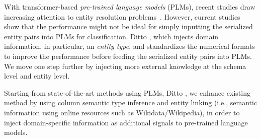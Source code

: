 With transformer-based \emph{pre-trained language models} (PLMs), recent studies draw increasing attention to entity resolution problems~\cite{li_deep_2020, trabelsi_dame_2022}. However, current studies show that the performance might not be ideal for simply inputting the serialized entity pairs into PLMs for classification. Ditto \cite{li_deep_2020}, which injects domain information, in particular, an \emph{entity type}, and standardizes the numerical formats to improve the performance before feeding the serialized entity pairs into PLMs. We move one step further by injecting more external knowledge at the schema level and entity level. 


Starting from state-of-the-art methods using PLMs, Ditto \cite{li_deep_2020}, we enhance existing method by using column semantic type inference \cite{hulsebos_sherlock_2019, suhara_annotating_2022} and entity linking \cite{ayoola_refined_2022} (i.e., semantic information using online resources such as Wikidata/Wikipedia), in order to inject domain-specific information as additional signals to pre-trained language models. 


    
